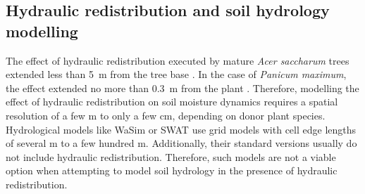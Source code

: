 \subsection{Hydraulic redistribution and soil hydrology modelling}

The effect of hydraulic redistribution executed by mature \emph{Acer saccharum} trees extended less than \SI{5}{\metre} from the tree base \parencite{dawson_hydraulic_1993}.  In the case of \emph{Panicum maximum}, the effect extended no more than \SI{0.3}{\metre} from the plant \parencite{sekiya_applying_2011}.  Therefore, modelling the effect of hydraulic redistribution on soil moisture dynamics requires a spatial resolution of a few \si{\metre} to only a few \si{\centi\metre}, depending on donor plant species.  Hydrological models like WaSim \parencite{schulla_hydrologische_1997} or SWAT \parencite{arnold_large_1998} use grid models with cell edge lengths of several \si{\metre} to a few hundred \si{\metre}.  Additionally, their standard versions usually do not include hydraulic redistribution.  Therefore, such models are not a viable option when attempting to model soil hydrology in the presence of hydraulic redistribution.

